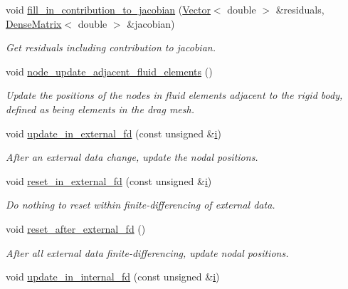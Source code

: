 \begin{DoxyCompactItemize}
void \hyperlink{classoomph_1_1ImmersedRigidBodyElement_ac3a062f70718c9bf85a470c2eca2c60f}{fill\+\_\+in\+\_\+contribution\+\_\+to\+\_\+jacobian} (\hyperlink{classoomph_1_1Vector}{Vector}$<$ double $>$ \&residuals, \hyperlink{classoomph_1_1DenseMatrix}{Dense\+Matrix}$<$ double $>$ \&jacobian)
\begin{DoxyCompactList}\small\item\em Get residuals including contribution to jacobian. \end{DoxyCompactList}\item 
void \hyperlink{classoomph_1_1ImmersedRigidBodyElement_af97075da52b4f7b4f01b849a30618ba7}{node\+\_\+update\+\_\+adjacent\+\_\+fluid\+\_\+elements} ()
\begin{DoxyCompactList}\small\item\em Update the positions of the nodes in fluid elements adjacent to the rigid body, defined as being elements in the drag mesh. \end{DoxyCompactList}\item 
void \hyperlink{classoomph_1_1ImmersedRigidBodyElement_a54a7da8fcacfc00c29c36561170ad3c6}{update\+\_\+in\+\_\+external\+\_\+fd} (const unsigned \&\hyperlink{cfortran_8h_adb50e893b86b3e55e751a42eab3cba82}{i})
\begin{DoxyCompactList}\small\item\em After an external data change, update the nodal positions. \end{DoxyCompactList}\item 
void \hyperlink{classoomph_1_1ImmersedRigidBodyElement_a54ca1acbe1ad39e6ff692a79062318a0}{reset\+\_\+in\+\_\+external\+\_\+fd} (const unsigned \&\hyperlink{cfortran_8h_adb50e893b86b3e55e751a42eab3cba82}{i})
\begin{DoxyCompactList}\small\item\em Do nothing to reset within finite-\/differencing of external data. \end{DoxyCompactList}\item 
void \hyperlink{classoomph_1_1ImmersedRigidBodyElement_a7812d2be5a267c95e954bc7c5f359fc6}{reset\+\_\+after\+\_\+external\+\_\+fd} ()
\begin{DoxyCompactList}\small\item\em After all external data finite-\/differencing, update nodal positions. \end{DoxyCompactList}\item 
void \hyperlink{classoomph_1_1ImmersedRigidBodyElement_a96a991a1b99ff591bebe076772fc99c3}{update\+\_\+in\+\_\+internal\+\_\+fd} (const unsigned \&\hyperlink{cfortran_8h_adb50e893b86b3e55e751a42eab3cba82}{i})

\end{DoxyCompactItemize}
